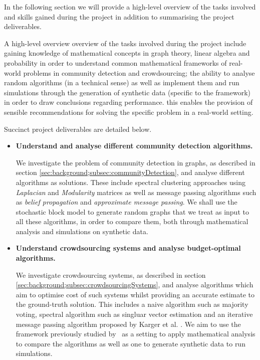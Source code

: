 \documentclass[12pt]{article}
\numberwithin{equation}{section}
\begin{document}
In the following section we will provide a high-level overview of the tasks involved and skills gained during the project in addition to summarising the project deliverables.

A high-level overview overview of the tasks involved during the project include gaining knowledge of mathematical concepts in graph theory, linear algebra and probability in order to understand common mathematical frameworks of real-world problems in community detection and crowdsourcing; the ability to analyse random algorithms (in a technical sense) as well as implement them and run simulations through the generation of synthetic data (specific to the framework) in order to draw conclusions regarding performance. this enables the provision of sensible recommendations for solving the specific problem in a real-world setting.

Succinct project deliverables are detailed below.
\begin{itemize}
	\item \textbf{Understand and analyse different community detection algorithms.}

	We investigate the problem of community detection in graphs, as described in section \ref{sec:background;subsec:communityDetection}, and analyse different algorithms as solutions. These include spectral clustering approaches using \textsl{Laplacian} and \textsl{Modularity} matrices as well as message passing algorithms such as \textsl{belief propagation} and \textsl{approximate message passing}. We shall use the stochastic block model to generate random graphs that we treat as input to all these algorithms, in order to compare them, both through mathematical analysis and simulations on synthetic data.

	\item \textbf{Understand crowdsourcing systems and analyse budget-optimal algorithms.}

	We investigate crowdsourcing systems, as described in section \ref{sec:background;subsec:crowdsourcingSystems}, and analyse algorithms which aim to optimise cost of such systems whilst providing an accurate estimate to the ground-truth solution. This includes a naive algorithm such as majority voting, spectral algorithm such as singluar vector estimation and an iterative message passing algorithm proposed by Karger et al. \cite{KOS13}. We aim to use the framework previously studied by~\cite{KOS13} as a setting to apply mathematical analysis to compare the algorithms as well as one to generate synthetic data to run simulations.
\end{itemize}
\end{document}
